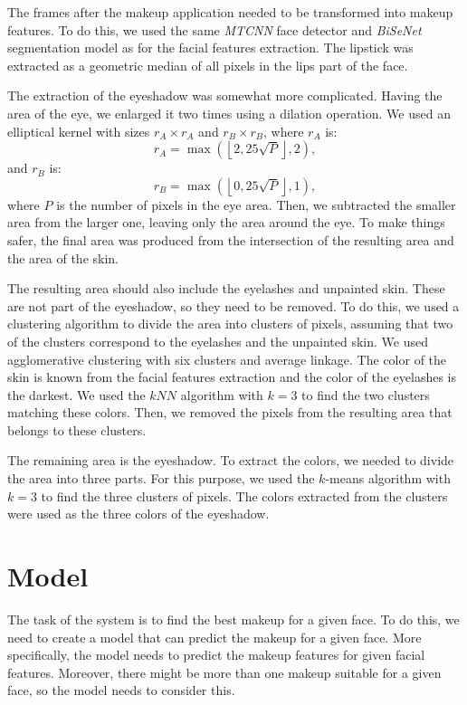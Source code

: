 \documentclass[conference]{IEEEtran}
\begin{document}
The frames after the makeup application needed to be transformed into makeup features.
To do this, we used the same \emph{MTCNN} face detector and \emph{BiSeNet} segmentation model as for the facial features extraction.
The lipstick was extracted as a geometric median of all pixels in the lips part of the face.

The extraction of the eyeshadow was somewhat more complicated.
Having the area of the eye, we enlarged it two times using a dilation operation.
We used an elliptical kernel with sizes $r_A \times r_A$ and $r_B \times r_B$, where $r_A$ is:
\begin{equation}
    r_A = \max{\left(\left\lfloor2{,}25\sqrt{P}\right\rfloor, 2\right)},
\end{equation}
and $r_B$ is:
\begin{equation}
    r_B = \max{\left(\left\lfloor0{,}25\sqrt{P}\right\rfloor, 1\right)},
\end{equation}
where $P$ is the number of pixels in the eye area.
Then, we subtracted the smaller area from the larger one, leaving only the area around the eye.
To make things safer, the final area was produced from the intersection of the resulting area and the area of the skin.

The resulting area should also include the eyelashes and unpainted skin.
These are not part of the eyeshadow, so they need to be removed.
To do this, we used a clustering algorithm to divide the area into clusters of pixels, assuming that two of the clusters correspond to the eyelashes and the unpainted skin.
We used agglomerative clustering with six clusters and average linkage.
The color of the skin is known from the facial features extraction and the color of the eyelashes is the darkest.
We used the $kNN$ algorithm with $k = 3$ to find the two clusters matching these colors.
Then, we removed the pixels from the resulting area that belongs to these clusters.

The remaining area is the eyeshadow.
To extract the colors, we needed to divide the area into three parts.
For this purpose, we used the $k$-means algorithm with $k = 3$ to find the three clusters of pixels.
The colors extracted from the clusters were used as the three colors of the eyeshadow.

\section{Model} \label{sec:model}

The task of the system is to find the best makeup for a given face.
To do this, we need to create a model that can predict the makeup for a given face.
More specifically, the model needs to predict the makeup features for given facial features.
Moreover, there might be more than one makeup suitable for a given face, so the model needs to consider this.
\end{document}
